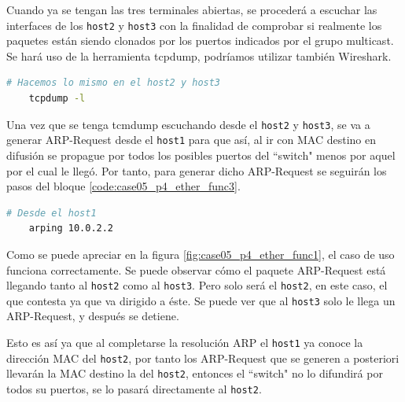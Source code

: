 Cuando ya se tengan las tres terminales abiertas, se procederá a escuchar las interfaces de los \texttt{host2} y \texttt{host3} con la finalidad de comprobar si realmente los paquetes están siendo clonados por los puertos indicados por el grupo multicast. Se hará uso de la herramienta tcpdump, podríamos utilizar también Wireshark.

\begin{lstlisting}[language= bash, style=Consola, caption={Puesta en escucha - Case05},label=code:case05_p4_ether_func2]
    # Hacemos lo mismo en el host2 y host3
    tcpdump -l
\end{lstlisting}
\vspace{1cm}

Una vez que se tenga tcmdump escuchando desde el \texttt{host2} y \texttt{host3}, se va a generar ARP-Request desde el \texttt{host1} para que así, al ir con MAC destino en difusión se propague por todos los posibles puertos del ``switch" menos por aquel por el cual le llegó. Por tanto, para generar dicho ARP-Request se seguirán los pasos del bloque \ref{code:case05_p4_ether_func3}.

\begin{lstlisting}[language= bash, style=Consola, caption={Generación de ARP-Request - Case05},label=code:case05_p4_ether_func3]
    # Desde el host1
    arping 10.0.2.2
\end{lstlisting}
\vspace{1cm}

Como se puede apreciar en la figura \ref{fig:case05_p4_ether_func1}, el caso de uso funciona correctamente. Se puede observar cómo el paquete ARP-Request está llegando tanto al \texttt{host2} como al \texttt{host3}. Pero solo será el \texttt{host2}, en este caso, el que contesta ya que va dirigido a éste. Se puede ver que al \texttt{host3} solo le llega un ARP-Request, y después se detiene.\\
\par
Esto es así ya que al completarse la resolución ARP el \texttt{host1} ya conoce la dirección MAC del \texttt{host2}, por tanto los ARP-Request que se generen a posteriori llevarán la MAC destino la del \texttt{host2}, entonces el ``switch" no lo difundirá por todos su puertos, se lo pasará directamente al \texttt{host2}.\\
\par

\newpage

